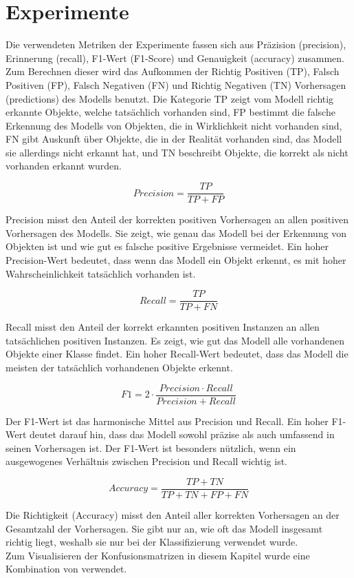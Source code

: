 \chapter{Experimente}
\label{ch:experimente}

Die verwendeten Metriken der Experimente fassen sich aus Präzision (precision), Erinnerung (recall), F1-Wert (F1-Score) und Genauigkeit (accuracy) zusammen. Zum Berechnen dieser wird das Aufkommen der Richtig Positiven (TP), Falsch Positiven (FP), Falsch Negativen (FN) und Richtig Negativen (TN) Vorhersagen (predictions) des Modells benutzt. Die Kategorie TP zeigt vom Modell richtig erkannte Objekte, welche tatsächlich vorhanden sind, FP bestimmt die falsche Erkennung des Modells von Objekten, die in Wirklichkeit nicht vorhanden sind, FN gibt Auskunft über Objekte, die in der Realität vorhanden sind, das Modell sie allerdings nicht erkannt hat, und TN beschreibt Objekte, die korrekt als nicht vorhanden erkannt wurden.

\[Precision = \frac{TP}{TP + FP}\]

Precision misst den Anteil der korrekten positiven Vorhersagen an allen positiven Vorhersagen des Modells. Sie zeigt, wie genau das Modell bei der Erkennung von Objekten ist und wie gut es falsche positive Ergebnisse vermeidet. Ein hoher Precision-Wert bedeutet, dass wenn das Modell ein Objekt erkennt, es mit hoher Wahrscheinlichkeit tatsächlich vorhanden ist.

\[Recall = \frac{TP}{TP + FN}\]

Recall misst den Anteil der korrekt erkannten positiven Instanzen an allen tatsächlichen positiven Instanzen. Es zeigt, wie gut das Modell alle vorhandenen Objekte einer Klasse findet. Ein hoher Recall-Wert bedeutet, dass das Modell die meisten der tatsächlich vorhandenen Objekte erkennt.

\[F1 = 2 \cdot \frac{Precision \cdot Recall}{Precision + Recall}\]

Der F1-Wert ist das harmonische Mittel aus Precision und Recall. Ein hoher F1-Wert deutet darauf hin, dass das Modell sowohl präzise als auch umfassend in seinen Vorhersagen ist. Der F1-Wert ist besonders nützlich, wenn ein ausgewogenes Verhältnis zwischen Precision und Recall wichtig ist.

\[Accuracy = \frac{TP + TN}{TP + TN + FP + FN}\]

Die Richtigkeit (Accuracy) misst den Anteil aller korrekten Vorhersagen an der Gesamtzahl der Vorhersagen. Sie gibt nur an, wie oft das Modell insgesamt richtig liegt, weshalb sie nur bei der Klassifizierung verwendet wurde.
\\
Zum Visualisieren der Konfusionsmatrizen in diesem Kapitel wurde eine Kombination von \cite{2020SciPy-NMeth, DamianoP2024confusionMatrixGenerator} verwendet.

